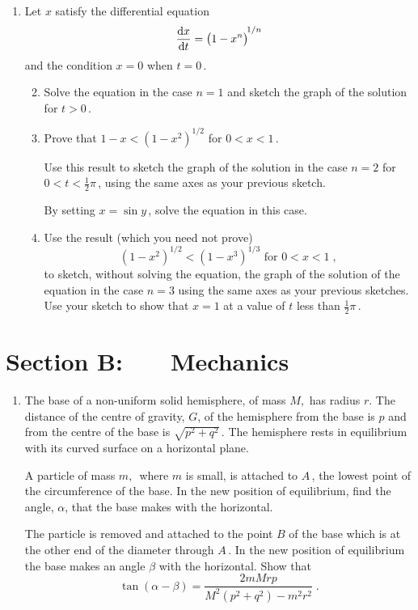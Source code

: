 \documentclass[a4, 11pt]{report}
\newlength{\qspace}
\newcounter{qnumber}
\newenvironment{question}%
 {\vspace{\qspace}
  \begin{enumerate}[\bfseries 1\quad][10]%
    \setcounter{enumi}{\value{qnumber}}%
    \item%
 }
{
  \end{enumerate}
  \filbreak
  \stepcounter{qnumber}
 }
\newenvironment{questionparts}[1][1]%
 {
  \begin{enumerate}[\bfseries (i)]%
    \setcounter{enumii}{#1}
    \addtocounter{enumii}{-1}
    \setlength{\itemsep}{5mm}
    \setlength{\parskip}{8pt}
 }
 {
  \end{enumerate}
 }
\def\d{{\mathrm d}}
\begin{document}
\begin{question}	
Let $x$ satisfy the differential equation
$$
\frac {\d x}{\d t} = {\big( 1-x^n\big)\vphantom{\Big)}}^{\!1/n} 
$$
and   the condition  $x=0$ when $t=0 \,$.

\begin{questionparts}
\item
Solve the equation in the case $n=1$ and sketch the graph of the solution for $t>0 \,$.

\item
Prove that $1-x <  (1-x^2)^{1/2} $ for $0<x<1 \,$. 

Use this result to
sketch the graph of the solution in the case $n=2$ for $0<t<\frac12 \pi \,$, 
using the same axes as your previous sketch.

By setting $x=\sin y\,$, solve the equation in this case.

\item
Use the result (which you need not prove)   
\[
(1-x^2)^{1/2} <  (1-x^3)^{1/3} \text{ \ \ for \ \ } 0<x<1 \;,
\] 
to sketch, without solving the equation, the graph of the solution
of the equation in the case $n=3$  using the same axes as your previous sketches.
Use your sketch to show that $x=1$ at a value of $t$ less than $\frac12 \pi \,$. 
\end{questionparts}
\end{question}	
		

		
	
\newpage
\section*{Section B: \ \ \ Mechanics}


	
\begin{question}
The base of a non-uniform solid hemisphere,
of mass $M,$ has radius $r.$ The distance of the centre of gravity, $G$, 
of the hemisphere from the base is $p$ and from the centre of the base 
is $\sqrt{p^2 + q^2} \,$.  The hemisphere rests in equilibrium with  its curved surface
on a horizontal plane. 


A particle of mass $m,\,$ where $m$ is small, 
is attached to $A\,$, the lowest point of the circumference of the base.  
In the new position of equilibrium,
find the angle, $\alpha$, that the base makes with the horizontal.


The particle is removed and attached to the point $B$ of the base 
which is at the other end of the diameter through $A\,$. In the new position
of equilibrium the base  makes an angle ${\beta}$ 
with the horizontal.
Show that
$$
\tan(\alpha-\beta)= 
\frac{2mMrp}  {M^2\left(p^2+q^2\right)-m^2r^2}\;.
$$ 
	\end{question}
	
\end{document}
